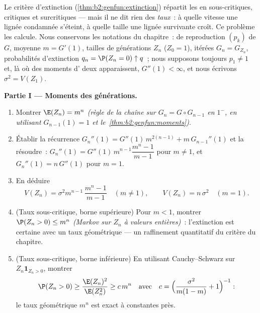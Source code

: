 \begin{problem}\label{pb:b2:genfun:1}
Le critère d'extinction (\cref{thm:b2:genfun:extinction})
répartit les  en
sous-critiques, critiques et surcritiques --- mais il ne dit
rien des \emph{taux}~: à quelle vitesse une lignée condamnée
s'éteint, à quelle taille une lignée survivante croît. Ce problème
les calcule. Nous conservons les notations du chapitre~:  de
reproduction $(p_k)$ de  $G$,
moyenne $m = G'(1)$, tailles de générations $Z_n$ ($Z_0 = 1$),
itérées $G_n = G_{Z_n}$, probabilités d'extinction $q_n = \P(Z_n = 0)
\uparrow q$~; nous supposons toujours $p_1 \neq 1$ et, là où des
moments d' deux apparaissent, $G''(1) < \infty$, et nous écrivons
$\sigma^2 = V(Z_1)$.

\medskip
\noindent\textbf{Partie I --- Moments des générations.}
\begin{enumerate}
  \item Montrer $\E(Z_n) = m^n$ \emph{(règle de la chaîne sur $G_n = G
        \circ G_{n-1}$ en $1^-$, en utilisant $G_{n-1}(1) = 1$ et le~\cref{thm:b2:genfun:moments})}.
  \item Établir la récurrence $G_n''(1) =
        G''(1)\,m^{2(n-1)} + m\,G_{n-1}''(1)$ et la résoudre~:
        $G_n''(1) = G''(1)\,m^{n-1}\dfrac{m^n - 1}{m - 1}$
        pour $m \neq 1$, et $G_n''(1) = n\,G''(1)$ pour $m =
        1$.
  \item En déduire
        \[
        V(Z_n) = \sigma^2m^{n-1}\,\frac{m^n - 1}{m - 1}
        \quad (m \neq 1),
        \qquad
        V(Z_n) = n\,\sigma^2 \quad (m = 1).
        \]
  \item (Taux sous-critique, borne supérieure) Pour $m < 1$, montrer
        $\P(Z_n > 0) \leq m^n$ \emph{(Markov sur $Z_n$ à valeurs
        entières)}~: l'extinction est certaine avec un
        taux géométrique --- un raffinement quantitatif du
        critère du chapitre.
  \item (Taux sous-critique, borne inférieure) En utilisant
        Cauchy--Schwarz sur $Z_n\mathbf 1_{Z_n > 0}$, montrer
        \[
        \P(Z_n > 0) \geq \frac{\E(Z_n)^2}{\E(Z_n^2)}
        \geq c\,m^{n}
        \quad\text{avec}\quad
        c = \Bigl(\frac{\sigma^2}{m(1-m)} + 1\Bigr)^{-1} :
        \]
        le taux géométrique $m^n$ est exact à constantes près.
\end{enumerate}


\end{problem}
